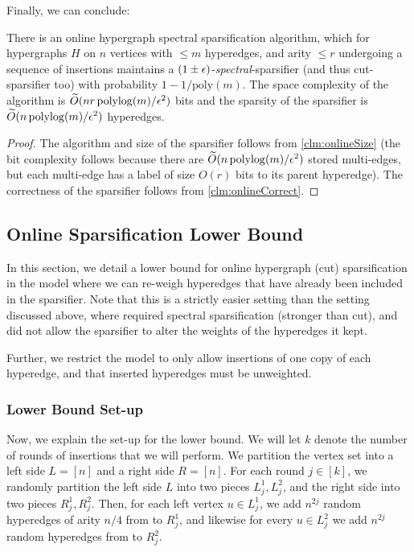 \documentclass{article}
\begin{document}
Finally, we can conclude:

\begin{theorem}
    There is an online hypergraph spectral sparsification algorithm, which for hypergraphs $H$ on $n$ vertices with $\leq m$ hyperedges, and arity $\leq r$ undergoing a sequence of insertions maintains a $(1 \pm \epsilon)$-\emph{spectral}-sparsifier (and thus cut-sparsifier too) with probability $1 - 1 / \mathrm{poly}(m)$. The space complexity of the algorithm is $\widetilde{O}(nr\operatorname{polylog}(m) / \epsilon^2)$ bits and the sparsity of the sparsifier is $\widetilde{O}(n \operatorname{polylog}(m) / \epsilon^2)$ hyperedges.
\end{theorem}

\begin{proof}
    The algorithm and size of the sparsifier follows from \cref{clm:onlineSize} (the bit complexity follows because there are $\widetilde{O}(n \operatorname{polylog}(m) / \epsilon^2)$ stored multi-edges, but each multi-edge has a label of size $O(r)$ bits to its parent hyperedge). The correctness of the sparsifier follows from \cref{clm:onlineCorrect}. 
\end{proof}

\subsection{Online Sparsification Lower Bound}\label{sec:ollb}

In this section, we detail a lower bound for online hypergraph (cut) sparsification in the model where we can re-weigh hyperedges that have already been included in the sparsifier. Note that this is a strictly easier setting than the setting discussed above, where required spectral sparsification (stronger than cut), and did not allow the sparsifier to alter the weights of the hyperedges it kept. 

Further, we restrict the model to only allow insertions of one copy of each hyperedge, and that inserted hyperedges must be unweighted.

\subsubsection{Lower Bound Set-up}

Now, we explain the set-up for the lower bound. We will let $k$ denote the number of rounds of insertions that we will perform. We partition the vertex set into a left side $L = [n]$ and a right side $R = [n]$. For each round $j \in [k]$, we randomly partition the left side $L$ into two pieces $L_j^1, L_j^2$, and the right side into two pieces $R_j^1, R_j^2$. Then, for each left vertex $u \in L_j^1$, we add $n^{2j}$ random hyperedges of arity $n/4$ from to $R_j^1$, and likewise for every $u \in L_j^2$ we add $n^{2j}$ random hyperedges from to $R_j^2$.
\end{document}
